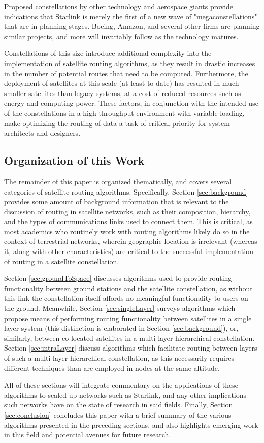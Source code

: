 Proposed constellations by other technology and aerospace giants provide indications that Starlink is merely the first of a new wave of "megaconstellations" that are in planning stages. Boeing, Amazon, and several other firms are planning similar projects, and more will invariably follow as the technology matures.

Constellations of this size introduce additional complexity into the implementation of satellite routing algorithms, as they result in drastic increases in the number of potential routes that need to be computed. Furthermore, the deployment of satellites at this scale (at least to date) has resulted in much smaller satellites than legacy systems, at a cost of reduced resources such as energy and computing power. These factors, in conjunction with the intended use of the constellations in a high throughput environment with variable loading, make optimizing the routing of data a task of critical priority for system architects and designers.

\subsection{Organization of this Work}\label{subsec:organization}
The remainder of this paper is organized thematically, and covers several categories of satellite routing algorithms. Specifically, Section \ref{sec:background} provides some amount of background information that is relevant to the discussion of routing in satellite networks, such as their composition, hierarchy, and the types of communications links used to connect them. This is critical, as most academics who routinely work with routing algorithms likely do so in the context of terrestrial networks, wherein geographic location is irrelevant (whereas it, along with other characteristics) are critical to the successful implementation of routing in a satellite constellation. 

Section \ref {sec:groundToSpace} discusses algorithms used to provide routing functionality between ground stations and the satellite constellation, as without this link the constellation itself affords no meaningful functionality to users on the ground. Meanwhile, Section \ref{sec:singleLayer} surveys algorithms which propose means of performing routing functionality between satellites in a single layer system (this distinction is elaborated in Section \ref{sec:background}), or, similarly, between co-located satellites in a multi-layer hierarchical constellation. Section \ref{sec:intraLayer} discuss algorithms which facilitate routing between layers of such a multi-layer hierarchical constellation, as this necessarily requires different techniques than are employed in nodes at the same altitude.  

All of these sections will integrate commentary on the applications of these algorithms to scaled up networks such as Starlink, and any other implications such networks have on the state of research in said fields. Finally, Section \ref{sec:conclusion} concludes this paper with a brief summary of the various algorithms presented in the preceding sections, and also highlights emerging work in this field and potential avenues for future research.